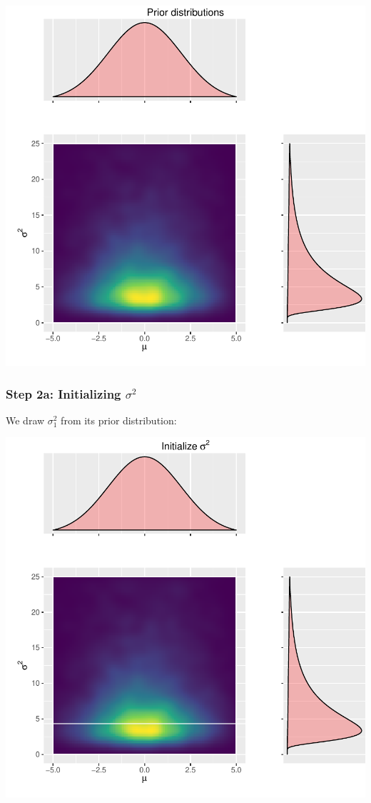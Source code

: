 \documentclass[
  11pt,
]{article}
\begin{document}
\begin{center}\includegraphics{01-02-lec_files/figure-latex/prior-plot-1} \end{center}

\hypertarget{step-2a-initializing-sigma2}{%
\subsubsection{\texorpdfstring{Step 2a: Initializing \(\sigma^2\)}{Step 2a: Initializing \textbackslash sigma\^{}2}}\label{step-2a-initializing-sigma2}}

We draw \(\sigma_1^2\) from its prior distribution:

\begin{center}\includegraphics{01-02-lec_files/figure-latex/initialize-tau-1} \end{center}
\end{document}
